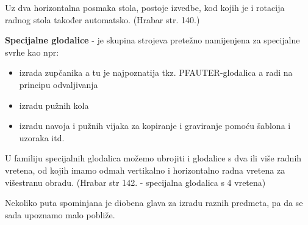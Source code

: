 \documentclass[a4paper,12pt]{article}
\numberwithin{figure}{section}
\begin{document}
Uz dva horizontalna posmaka stola, postoje izvedbe, kod kojih je i rotacija radnog stola također automatsko. (Hrabar str. 140.)\par
\textbf{Specijalne glodalice} - je skupina strojeva pretežno namijenjena za specijalne svrhe kao npr:
\begin{itemize}
\item izrada zupčanika a tu je najpoznatija tkz. PFAUTER-glodalica a radi na principu odvaljivanja
\item izradu pužnih kola
\item izradu navoja i pužnih vijaka
za kopiranje i graviranje pomoću šablona i uzoraka itd.
\end{itemize}
U familiju specijalnih glodalica možemo ubrojiti i glodalice s dva ili više radnih vretena, od kojih imamo odmah vertikalno i horizontalno radna vretena za višestranu obradu. (Hrabar str 142. - specijalna glodalica s 4 vretena)\par
Nekoliko puta spominjana je diobena glava za izradu raznih predmeta, pa da se sada upoznamo malo pobliže.
\end{document}
